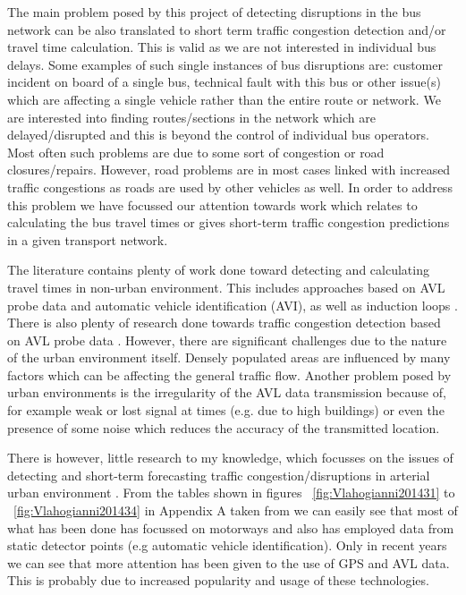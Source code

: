 The main problem posed by this project of detecting disruptions in the bus network can be also translated to short term traffic congestion detection and/or travel time calculation. This is valid as we are not interested in individual bus delays. Some examples of such single instances of bus disruptions are: customer incident on board of a single bus, technical fault with this bus or other issue(s) which are affecting a single vehicle rather than the entire route or network. We are interested into finding routes/sections in the network which are delayed/disrupted and this is beyond the control of individual bus operators. Most often such problems are due to some sort of congestion or road closures/repairs. However, road problems are in most cases linked with increased traffic congestions as roads are used by other vehicles as well. In order to address this problem we have focussed our attention towards work which relates to calculating the bus travel times or gives short-term traffic congestion predictions in a given transport network.

The literature contains plenty of work done toward detecting and calculating travel times in non-urban environment. This includes approaches based on AVL probe data and automatic vehicle identification (AVI), as well as induction loops \cite{Vlahogianni20143}. There is also plenty of research done towards traffic congestion detection based on AVL probe data \cite{Vlahogianni20143}. However, there are significant challenges due to the nature of the urban environment itself. Densely populated areas are influenced by many factors which can be affecting the general traffic flow. Another problem posed by urban environments is the irregularity of the AVL data transmission because of, for example weak or lost signal at times (e.g. due to high buildings) or even the presence of some noise which reduces the accuracy of the transmitted location. 

There is however, little research to my knowledge, which focusses on the issues of detecting and short-term forecasting traffic congestion/disruptions in arterial urban environment  \cite{Vlahogianni20143} \cite{5625144}. From the tables shown in figures ~\ref{fig:Vlahogianni201431} to ~\ref{fig:Vlahogianni201434} in Appendix A taken from \cite{Vlahogianni20143} we can easily see that most of what has been done has focussed on motorways and also has employed data from static detector points (e.g automatic vehicle identification). Only in recent years we can see that more attention has been given to the use of GPS and AVL data. This is probably due to increased popularity and usage of these technologies.

